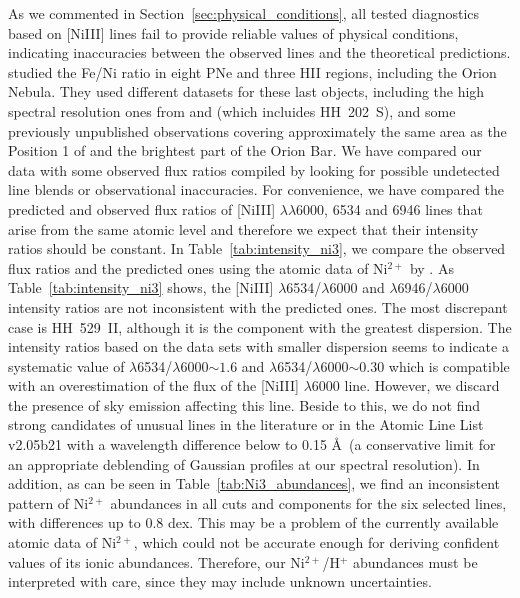 \documentclass[fleqn,usenatbib]{mnras}
\begin{document}
As we commented in Section~\ref{sec:physical_conditions}, all tested diagnostics based on \mbox{[Ni}\thinspace \mbox{III]} lines fail to provide reliable values of physical conditions, indicating inaccuracies between the observed lines and the theoretical predictions. \citet{delgadoinglada16} studied the Fe/Ni ratio in eight PNe and three H\thinspace II regions, including the Orion Nebula. They used different datasets for these last objects, including the high spectral resolution ones from \citet{Esteban04} and  \citet{mesadelgado09} (which incluides HH~202~S), and some previously unpublished observations covering approximately the same area as the Position 1 of \citet{Esteban98} and the brightest part of the Orion Bar. We have compared our data with some observed flux ratios compiled by \citet{delgadoinglada16} looking for possible undetected line blends or observational inaccuracies. For convenience, we have compared the predicted and observed flux ratios of [Ni\thinspace III] $\lambda \lambda$6000, 6534 and 6946 lines that arise from the same atomic level and therefore we expect that their intensity ratios should be constant. In Table~\ref{tab:intensity_ni3}, we compare the observed flux ratios and the predicted ones using the atomic data of Ni$^{2+}$ by \citet{Bautista01}. As Table~\ref{tab:intensity_ni3} shows, the [Ni\thinspace III] $\lambda$6534/$\lambda$6000 and $\lambda$6946/$\lambda$6000 intensity ratios are not inconsistent with the predicted ones. The most discrepant case is HH~529~II, although it is the component with the greatest dispersion. The intensity ratios based on the data sets with smaller dispersion seems to indicate a systematic value of $\lambda$6534/$\lambda$6000$\sim 1.6$ and $\lambda$6534/$\lambda$6000$\sim 0.30$ which is compatible with an overestimation of the flux of the [Ni\thinspace III] $\lambda 6000$ line. However, we discard the presence of sky emission affecting this line. Beside to this, we do not find strong candidates of unusual lines in the literature or in the Atomic Line List v2.05b21 with a wavelength difference below to 0.15 \AA\ (a conservative limit for an appropriate deblending of Gaussian profiles at our spectral resolution). In addition, as can be seen in  Table~\ref{tab:Ni3_abundances}, we find an inconsistent pattern of Ni$^{2+}$ abundances in all cuts and components for the six selected lines, with differences up to 0.8 dex. This may be a problem of the currently available atomic data of Ni$^{2+}$, which could not be accurate enough for deriving confident values of its ionic abundances. Therefore, our Ni$^{2+}$/H$^+$ abundances must be interpreted with care, since they may include unknown uncertainties.
\end{document}
